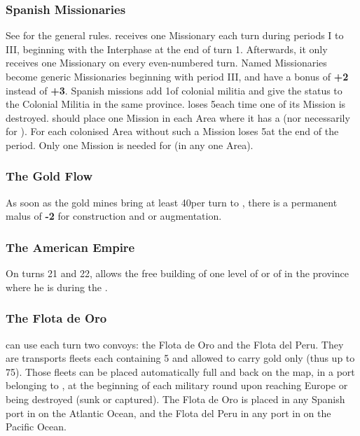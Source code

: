 \subsubsection{Spanish Missionaries}
\aparag See  for the general rules.
\aparag \SPA receives one Missionary each turn during periods I to III,
beginning with the Interphase at the end of turn 1. Afterwards, it only
receives one Missionary on every even-numbered turn.
\aparag Named Missionaries become generic Missionaries beginning with
period III, and have a bonus of {\bf +2} instead of {\bf +3}.
\aparag Spanish missions add 1\LDE of colonial militia and give the
 status to the Colonial Militia in the same province.
\aparag \SPA loses 5\PV each time one of its Mission is destroyed.
\aparag \SPA should place one Mission in each Area where it has a \COL
(nor necessarily for \TP). For each colonised Area without such a
Mission \SPA loses 5\PV at the end of the period.
\bparag Only one Mission is needed for 
(in any one Area).


\subsubsection{The Gold Flow}
\aparag As soon as the gold mines bring at least 40\ducats per turn to
\SPA, there is a permanent malus of {\bf -2} for \MNU construction and
\FTI or \DTI augmentation.


\subsubsection{The American Empire}
\aparag On turns 21 and 22,  allows the free building
of one level of  or of  in the \ROTW
province where he is during the .


\subsubsection{The Flota de Oro}
\aparag \SPA can use each turn two convoys: the Flota de Oro and the
Flota del Peru. They are transports fleets each containing 5 \NTD and
allowed to carry gold only (thus up to 75\ducats).
\bparag Those fleets can be placed automatically full and back on the
\ROTW map, in a \COL port belonging to \SPA, at the beginning of each
military round upon reaching Europe or being destroyed (sunk or
captured).
\bparag The Flota de Oro is placed in any Spanish port in
 on the Atlantic Ocean, and the Flota del Peru in any
port in  on the Pacific Ocean.

